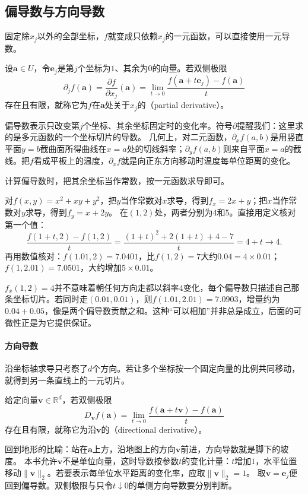 \subsection{偏导数与方向导数}

固定除$x_j$以外的全部坐标，$f$就变成只依赖$x_j$的一元函数，可以直接使用一元导数。
\begin{definition}[偏导数]
\label{def:multivariable-partial-derivative}
设$\bm a\in U$，令$\bm e_j$是第$j$个坐标为$1$、其余为$0$的向量。若双侧极限
\[
 \partial_jf(\bm a)=\frac{\partial f}{\partial x_j}(\bm a)
 =\lim_{t\to0}\frac{f(\bm a+t\bm e_j)-f(\bm a)}t
\]
存在且有限，就称它为$f$在$\bm a$处关于$x_j$的（partial derivative）。
\end{definition}
偏导数表示只改变第$j$个坐标、其余坐标固定时的变化率。符号$\partial$提醒我们：这里求的是多元函数的一个坐标切片的导数。
几何上，对二元函数，$\partial_xf(a,b)$是用竖直平面$y=b$截曲面所得曲线在$x=a$处的切线斜率；$\partial_yf(a,b)$则来自平面$x=a$的截线。把$f$看成平板上的温度，$\partial_xf$就是向正东方向移动时温度每单位距离的变化。

计算偏导数时，把其余坐标当作常数，按一元函数求导即可。
\begin{example}[二次函数的偏导数]
\label{ex:multivariable-quadratic-partials}
对$f(x,y)=x^2+xy+y^2$，把$y$当作常数对$x$求导，得到$f_x=2x+y$；把$x$当作常数对$y$求导，得到$f_y=x+2y$。
在$(1,2)$处，两者分别为$4$和$5$。直接用定义核对第一个值：
\[
 \frac{f(1+t,2)-f(1,2)}t=\frac{(1+t)^2+2(1+t)+4-7}{t}=4+t\longrightarrow4.
\]
再用数值核对：$f(1.01,2)=7.0401$，比$f(1,2)=7$大约$0.04=4\times0.01$；$f(1,2.01)=7.0501$，大约增加$5\times0.01$。
\end{example}

$f_x(1,2)=4$并不意味着朝任何方向走都以斜率$4$变化，每个偏导数只描述自己那条坐标切片。若同时走$(0.01,0.01)$，则$f(1.01,2.01)=7.0903$，增量约为$0.04+0.05$，像是两个偏导数贡献之和。这种“可以相加”并非总是成立，后面的可微性正是为它提供保证。

\paragraph{方向导数}

沿坐标轴求导只考察了$d$个方向。若让多个坐标按一个固定向量的比例共同移动，就得到另一条直线上的一元切片。
\begin{definition}[方向导数]
\label{def:multivariable-directional-derivative}
给定向量$\bm v\in\mathbb R^d$，若双侧极限
\[
 D_{\bm v}f(\bm a)
 =\lim_{t\to0}\frac{f(\bm a+t\bm v)-f(\bm a)}t
\]
存在且有限，就称它为沿$\bm v$的（directional derivative）。
\end{definition}
回到地形的比喻：站在$\bm a$上方，沿地图上的方向$\bm v$前进，方向导数就是脚下的坡度。
本书允许$\bm v$不是单位向量，这时导数按参数$t$的变化计量：$t$增加$1$，水平位置移动$\lVert\bm v\rVert_2$。若要表示每单位水平距离的变化率，应取$\lVert\bm v\rVert_2=1$。
取$\bm v=\bm e_j$便回到偏导数。双侧极限与只令$t\downarrow0$的单侧方向导数要分别判断。

